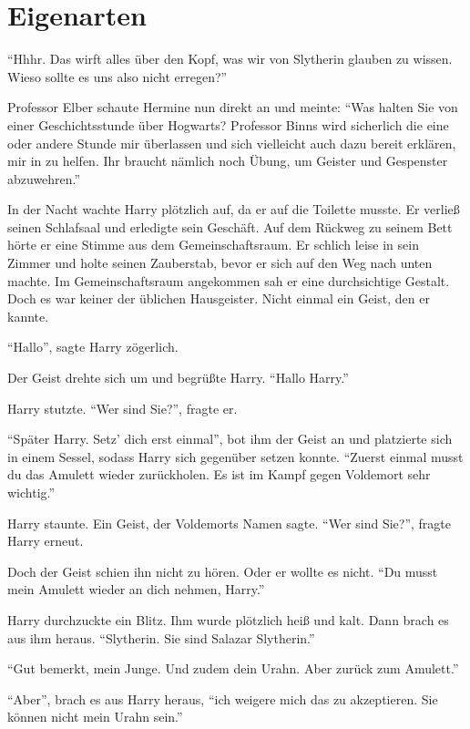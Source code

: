 \chapter{Eigenarten}


\enquote{Hhhr. Das wirft alles über den Kopf, was wir von Slytherin glauben zu wissen. Wieso sollte es uns also nicht erregen?}

Professor Elber schaute Hermine nun direkt an und meinte: \enquote{Was halten Sie von einer Geschichtsstunde über Hogwarts? Professor Binns wird sicherlich die eine oder andere Stunde mir überlassen und sich vielleicht auch dazu bereit erklären, mir in \VgddK zu helfen. Ihr braucht nämlich noch Übung, um Geister und Gespenster abzuwehren.}

\trenn

In der Nacht wachte Harry plötzlich auf, da er auf die Toilette musste. Er verließ seinen Schlafsaal und erledigte sein Geschäft. Auf dem Rückweg zu seinem Bett hörte er eine Stimme aus dem Gemeinschaftsraum. Er schlich leise in sein Zimmer und holte seinen Zauberstab, bevor er sich auf den Weg nach unten machte. Im Gemeinschaftsraum angekommen sah er eine durchsichtige Gestalt. Doch es war keiner der üblichen Hausgeister. Nicht einmal ein Geist, den er kannte.

\enquote{Hallo}, sagte Harry zögerlich.

Der Geist drehte sich um und begrüßte Harry. \enquote{Hallo Harry.}

Harry stutzte. \enquote{Wer sind Sie?}, fragte er.

\enquote{Später Harry. Setz’ dich erst einmal}, bot ihm der Geist an und platzierte sich in einem Sessel, sodass Harry sich gegenüber setzen konnte. \enquote{Zuerst einmal musst du das Amulett wieder zurückholen. Es ist im Kampf gegen Voldemort sehr wichtig.}

Harry staunte. Ein Geist, der Voldemorts Namen sagte. \enquote{Wer sind Sie?}, fragte Harry erneut.

Doch der Geist schien ihn nicht zu hören. Oder er wollte es nicht. \enquote{Du musst mein Amulett wieder an dich nehmen, Harry.}

Harry durchzuckte ein Blitz. Ihm wurde plötzlich heiß und kalt. Dann brach es aus ihm heraus. \enquote{Slytherin. Sie sind Salazar Slytherin.}

\enquote{Gut bemerkt, mein Junge. Und zudem dein Urahn. Aber zurück zum Amulett.}

\enquote{Aber}, brach es aus Harry heraus, \enquote{ich weigere mich das zu akzeptieren. Sie können nicht mein Urahn sein.}

